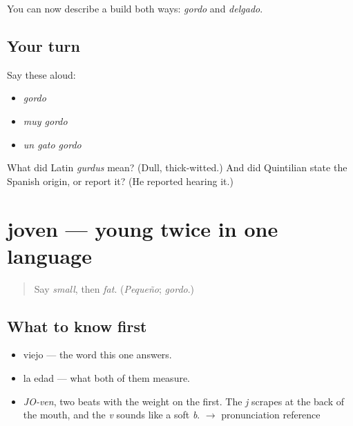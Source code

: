 \begin{grammarlens}[title={What you've built}]
You can now describe a build both ways: \emph{gordo} and \emph{delgado}.
\end{grammarlens}

\subsection*{Your turn}
Say these aloud:

\begin{itemize}
\raggedright
  \item \emph{gordo}
  \item \emph{muy gordo}
  \item \emph{un gato gordo}
\end{itemize}

\begin{tcolorbox}[breakable,colback=teal!4,colframe=teal!35!black,title={Before you move on}]
What did Latin \emph{gurdus} mean? (Dull, thick-witted.) And did Quintilian state the Spanish origin, or report it? (He reported hearing it.)
\end{tcolorbox}
\section[joven]{joven — young twice in one language}

\label{lesson:ES-C371-joven}



\begin{quote}
Say \emph{small}, then \emph{fat}. (\emph{Pequeño}; \emph{gordo}.)
\end{quote}

\subsection*{What to know first}
\begin{itemize}
\raggedright
  \item viejo — the word this one answers.
  \item la edad — what both of them measure.
\end{itemize}

\begin{sounds}
\begin{itemize}
\raggedright
  \item \emph{JO-ven}, two beats with the weight on the first. The \emph{j} scrapes at the back of the mouth, and the \emph{v} sounds like a soft \emph{b}. $\to$ pronunciation reference
\end{itemize}
\end{sounds}

